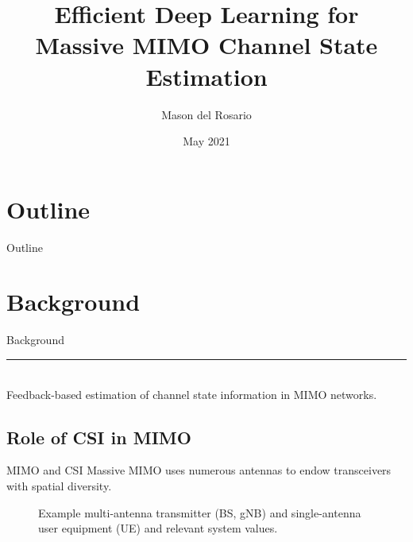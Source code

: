 \documentclass{beamer}
\title{Efficient Deep Learning for Massive MIMO Channel State Estimation}
\author{\small{Mason del Rosario}}
\institute{Doctoral Qualifying Examination}
\date{May 2021} %
\newcommand{\fignocap}[2]{
	\begin{figure}[!hbtp]
	    \centering
		\texttt{[image: \#2]}
	\end{figure}
}
\begin{document}
% 


{ 
\frame{\titlepage}}

\section*{Outline}\begin{frame}{Outline}\tableofcontents\end{frame}

\section{Background}

  \begin{frame}[plain]
    \vfill
    \centering
    \begin{beamercolorbox}[sep=8pt,center,shadow=true,rounded=true]{Background}
      \insertsectionhead\par%
      \color{davisblue}\noindent\rule{10cm}{1pt} \\
      \footnotesize{Feedback-based estimation of channel state information in MIMO networks.}
    \end{beamercolorbox}
    \vfill
  \end{frame}

\subsection{Role of CSI in MIMO}


	\begin{frame}{MIMO and CSI}
		Massive MIMO uses numerous antennas to endow transceivers with spatial diversity.
    \begin{figure}[!hbtp]
    \centering
    {
      \fontsize{4pt}{8pt}
      \def\svgwidth{0.9\columnwidth}
      
    }
    \caption{Example multi-antenna transmitter (BS, gNB) and single-antenna user equipment (UE) and relevant system values.}
    \label{fig:mimo_schematic}
    \end{figure}
	\end{frame}
\end{document}
